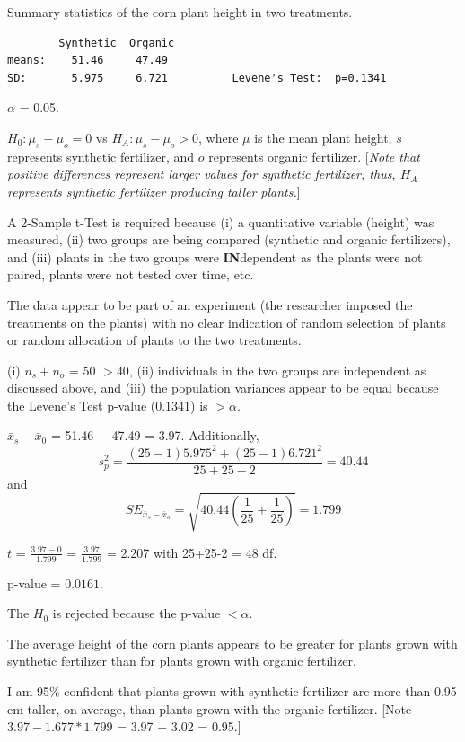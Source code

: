 \documentclass[10pt,openany]{book}\usepackage[]{graphicx}\usepackage[]{color}
\begin{document}
\vspace*{-4pt}
\begin{table}[htbp]
  \caption{Summary statistics of the corn plant height in two treatments.}
  \label{tab:CornFert}
\vspace*{-5pt}
  \begin{center}
    \begin{minipage}{4.5in}
      \begin{Verbatim}
        Synthetic  Organic
means:    51.46     47.49
SD:       5.975     6.721          Levene's Test:  p=0.1341
      \end{Verbatim}
    \end{minipage}
  \end{center}
\end{table}
\vspace*{-18pt}

\begin{Enumerate}
  \item $\alpha$ = 0.05.
  \item $H_{0}:\mu_{s}-\mu_{o} = 0$ vs $H_{A}:\mu_{s}-\mu_{o} > 0$, where $\mu$ is the mean plant height, $s$ represents synthetic fertilizer, and $o$ represents organic fertilizer. [\textit{Note that positive differences represent larger values for synthetic fertilizer; thus, $H_{A}$ represents synthetic fertilizer producing taller plants.}]
  \item A 2-Sample t-Test is required because (i) a quantitative variable (height) was measured, (ii) two groups are being compared (synthetic and organic fertilizers), and (iii) plants in the two groups were \textbf{IN}dependent as the plants were not paired, plants were not tested over time, etc.
  \item The data appear to be part of an experiment (the researcher imposed the treatments on the plants) with no clear indication of random selection of plants or random allocation of plants to the two treatments.
  \item (i) $n_{s}+n_{o}$ = 50 $> 40$, (ii) individuals in the two groups are independent as discussed above, and (iii) the population variances appear to be equal because the Levene's Test p-value (0.1341) is $> \alpha$.
  \item $\bar{x}_{s}-\bar{x}_{0}$ = 51.46 $-$ 47.49 = 3.97. Additionally,
    \[s_{p}^{2}=\frac{(25-1)5.975^{2}+(25-1)6.721^{2}}{25+25-2} = 40.44 \]
and
    \[ SE_{\bar{x}_{s}-\bar{x}_{o}}=\sqrt{40.44\left(\frac{1}{25}+\frac{1}{25} \right)} = 1.799  \]
  \item $t$ = $\frac{3.97-0}{1.799}$ = $\frac{3.97}{1.799}$ = 2.207 with 25+25-2 = 48 df.
  \item p-value = $0.0161$.
  \item The $H_{0}$ is rejected because the p-value $< \alpha$.
  \item The average height of the corn plants appears to be greater for plants grown with synthetic fertilizer than for plants grown with organic fertilizer.
  \item I am 95\% confident that plants grown with synthetic fertilizer are more than 0.95 cm taller, on average, than plants grown with the organic fertilizer. [Note $3.97-1.677*1.799$ = 3.97 $-$ 3.02 = 0.95.]
\end{Enumerate}
\end{document}
